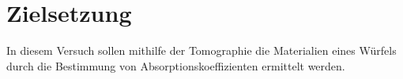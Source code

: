 \section{Zielsetzung}
\label{sec:Zielsetzung}
In diesem Versuch sollen mithilfe der Tomographie die Materialien eines Würfels durch die
Bestimmung von Absorptionskoeffizienten ermittelt werden.
